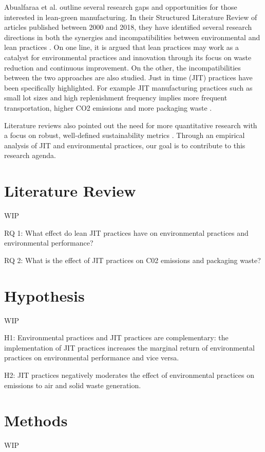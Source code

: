 \documentclass[]{article}
\begin{document}
Abualfaraa et al. outline several research gaps and opportunities for those interested in lean-green manufacturing. 
In their Structured Literature Review of articles published between 2000 and 2018, they have identified several research directions in both the synergies and incompatibilities between environmental and lean practices \citep{abualfaraaLeanGreenManufacturingPractices2020}. 
On one line, it is argued that lean practices may work as a catalyst for environmental practices and innovation through its focus on waste reduction and continuous improvement.
On the other, the incompatibilities between the two approaches are also studied. 
Just in time (JIT) practices have been specifically highlighted. 
For example JIT manufacturing practices such as small lot sizes and high replenishment frequency implies more frequent transportation, higher CO2 emissions and more packaging waste \citep{diesteRelationshipLeanEnvironmental2019}.

Literature reviews also pointed out the need for more quantitative research with a focus on robust, well-defined sustainability metrics \citep{abualfaraaLeanGreenManufacturingPractices2020}. 
Through an empirical analysis of JIT and environmental practices, our goal is to contribute to this research agenda.
    
\section{Literature Review}
WIP

RQ 1: What effect do lean JIT practices have on environmental practices and environmental performance?

RQ 2: What is the effect of JIT practices on C02 emissions and packaging waste?

\section{Hypothesis}
WIP

H1: Environmental practices and JIT practices are complementary: the implementation of JIT practices increases the marginal return of environmental practices on environmental performance and vice versa.

H2: JIT practices negatively moderates the effect of environmental practices on emissions to air and solid waste generation.

\section{Methods}
WIP  
\end{document}
